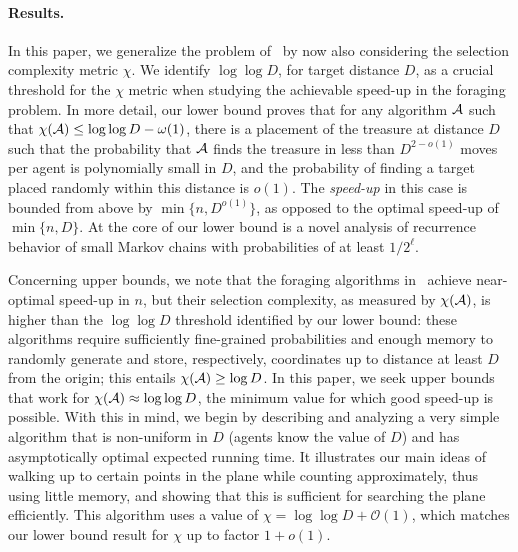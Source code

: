 \documentclass[11pt]{article}
\newcommand{\BO}{\mathcal{O}}
\begin{document}
\paragraph{Results.}
In this paper, we generalize the problem of~\cite{feinerman12podc} by now also considering the selection complexity metric $\chi$. 
We identify $\log\log{D}$, for target distance $D$, as a crucial threshold for the $\chi$ metric when studying the achievable speed-up in the foraging problem. In more detail, our lower bound proves that for any algorithm ${\cal A}$ such that $\chi({\cal A}) \leq \log\log{D} - \omega(1)$, there is a placement of the treasure at distance $D$ such that the probability that ${\cal A}$ finds the treasure in less than $D^{2-o(1)}$ moves per agent is polynomially small in $D$, and the probability of finding a target placed randomly within this distance is $o(1)$. The {\em speed-up} in this case is bounded from above by $\min\{n, D^{o(1)}\}$, as opposed to the optimal speed-up of $\min\{n,D\}$. At the core of our lower bound is a novel analysis of recurrence behavior of small Markov chains with probabilities of at least $1/2^\ell$.

Concerning upper bounds, we note that the foraging algorithms in~\cite{feinerman12podc} achieve near-optimal speed-up in $n$, but their selection complexity, as measured by $\chi({\cal A})$, is higher than the $\log\log{D}$ threshold identified by our lower bound: these algorithms require sufficiently fine-grained probabilities and enough memory to randomly generate and store, respectively, coordinates up to distance at least $D$ from the origin; this entails $\chi({\cal A})\geq \log{D}$. In this paper, we seek upper bounds that work for $\chi({\cal A}) \approx \log\log{D}$, the minimum value for which good speed-up is possible. With this in mind, we begin by describing and analyzing a very simple algorithm that is non-uniform in $D$ (agents know the value of $D$) and has asymptotically optimal expected running time. It illustrates our main ideas of walking up to certain points in the plane while counting approximately, thus using little memory, and showing that this is sufficient for searching the plane efficiently. This algorithm uses a value of $\chi = \log \log D + \BO(1)$, which matches our lower bound result for $\chi$ up to factor $1 + o(1)$.
\end{document}
